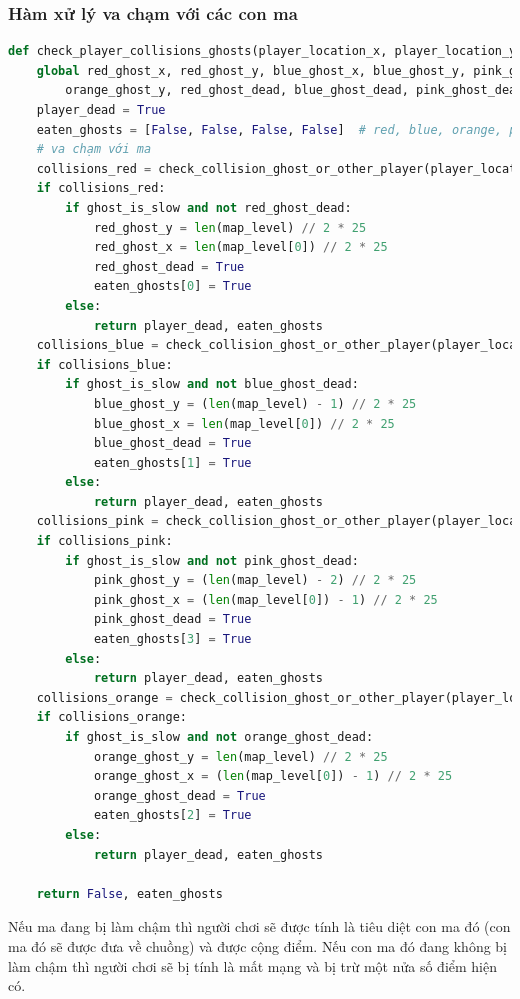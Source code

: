 \documentclass[a4paper]{article}
\begin{document}
\newpage
\subsubsection{Hàm xử lý va chạm với các con ma}
\begin{lstlisting}[language=Python]
def check_player_collisions_ghosts(player_location_x, player_location_y):
    global red_ghost_x, red_ghost_y, blue_ghost_x, blue_ghost_y, pink_ghost_x, pink_ghost_y, orange_ghost_x, \
        orange_ghost_y, red_ghost_dead, blue_ghost_dead, pink_ghost_dead, orange_ghost_dead
    player_dead = True
    eaten_ghosts = [False, False, False, False]  # red, blue, orange, pink
    # va chạm với ma
    collisions_red = check_collision_ghost_or_other_player(player_location_x, player_location_y, red_ghost_x,red_ghost_y)
    if collisions_red:
        if ghost_is_slow and not red_ghost_dead:
            red_ghost_y = len(map_level) // 2 * 25
            red_ghost_x = len(map_level[0]) // 2 * 25
            red_ghost_dead = True
            eaten_ghosts[0] = True
        else:
            return player_dead, eaten_ghosts
    collisions_blue = check_collision_ghost_or_other_player(player_location_x, player_location_y, blue_ghost_x,blue_ghost_y)
    if collisions_blue:
        if ghost_is_slow and not blue_ghost_dead:
            blue_ghost_y = (len(map_level) - 1) // 2 * 25
            blue_ghost_x = len(map_level[0]) // 2 * 25
            blue_ghost_dead = True
            eaten_ghosts[1] = True
        else:
            return player_dead, eaten_ghosts
    collisions_pink = check_collision_ghost_or_other_player(player_location_x, player_location_y, pink_ghost_x,pink_ghost_y)
    if collisions_pink:
        if ghost_is_slow and not pink_ghost_dead:
            pink_ghost_y = (len(map_level) - 2) // 2 * 25
            pink_ghost_x = (len(map_level[0]) - 1) // 2 * 25
            pink_ghost_dead = True
            eaten_ghosts[3] = True
        else:
            return player_dead, eaten_ghosts
    collisions_orange = check_collision_ghost_or_other_player(player_location_x, player_location_y, orange_ghost_x,orange_ghost_y)
    if collisions_orange:
        if ghost_is_slow and not orange_ghost_dead:
            orange_ghost_y = len(map_level) // 2 * 25
            orange_ghost_x = (len(map_level[0]) - 1) // 2 * 25
            orange_ghost_dead = True
            eaten_ghosts[2] = True
        else:
            return player_dead, eaten_ghosts

    return False, eaten_ghosts
\end{lstlisting}
Nếu ma đang bị làm chậm thì người chơi sẽ được tính là tiêu diệt con ma đó (con ma đó sẽ được đưa về chuồng) và được cộng điểm. Nếu con ma đó đang không bị làm chậm thì người chơi sẽ bị tính là mất mạng và bị trừ một nửa số điểm hiện có.
\end{document}
